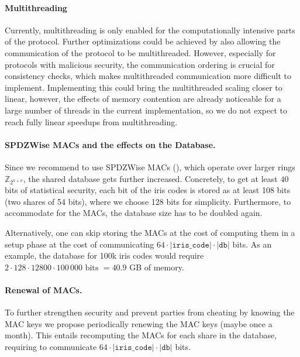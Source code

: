 \documentclass[a4paper,11pt,
]{article}
\newcommand{\Z}{\ensuremath{\mathbb{Z}}\xspace}
\begin{document}
\paragraph{Multithreading}
Currently, multithreading is only enabled for the computationally intensive parts of the protocol. Further optimizations could be achieved by also allowing the communication of the protocol to be multithreaded. However, especially for protocols with malicious security, the communication ordering is crucial for consistency checks, which makes multithreaded communication more difficult to implement. Implementing this could bring the multithreaded scaling closer to linear, however, the effects of memory contention are already noticeable for a large number of threads in the current implementation, so we do not expect to reach fully linear speedups from multithreading.

\paragraph{SPDZWise MACs and the effects on the Database.}
Since we recommend to use SPDZWise MACs (), which operate over larger rings $\Z_{2^{k + \sigma}}$, the shared database gets further increased. Concretely, to get at least $40$ bits of statistical security, each bit of the iris codes is stored as at least 108 bits (two shares of 54 bits), where we choose 128 bits for simplicity. Furthermore, to accommodate for the MACs, the database size has to be doubled again.

Alternatively, one can skip storing the MACs at the cost of computing them in a setup phase at the cost of communicating $64 \cdot |\texttt{iris\_code}| \cdot |\texttt{db}|$ bits.
As an example, the database for 100k iris codes would require $2 \cdot 128 \cdot 12800 \cdot 100\,000 \text{ bits } = 40.9$ GB of memory.

\paragraph{Renewal of MACs.}
To further strengthen security and prevent parties from cheating by knowing the MAC keys we propose periodically renewing the MAC keys (maybe once a month). This entails recomputing the MACs for each share in the database, requiring to communicate $64 \cdot |\texttt{iris\_code}| \cdot |\texttt{db}|$ bits.
\end{document}

